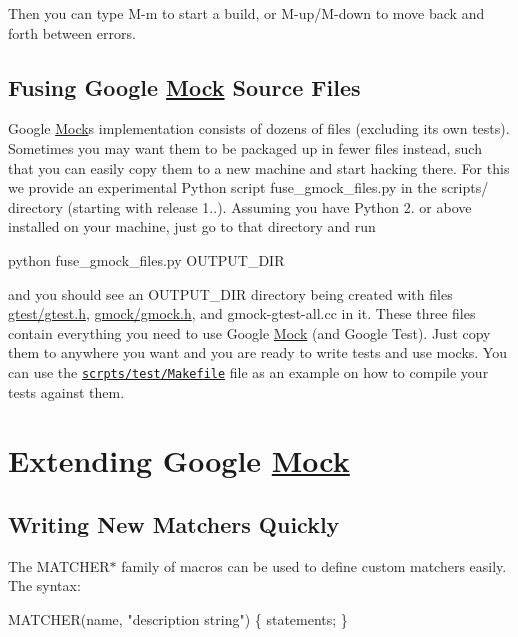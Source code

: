 Then you can type {\ttfamily M-\/m} to start a build, or {\ttfamily M-\/up}/{\ttfamily M-\/down} to move back and forth between errors.

\subsection*{Fusing Google \hyperlink{class_mock}{Mock} Source Files}

Google \hyperlink{class_mock}{Mock}\textquotesingle{}s implementation consists of dozens of files (excluding its own tests). Sometimes you may want them to be packaged up in fewer files instead, such that you can easily copy them to a new machine and start hacking there. For this we provide an experimental Python script {\ttfamily fuse\+\_\+gmock\+\_\+files.\+py} in the {\ttfamily scripts/} directory (starting with release 1..). Assuming you have Python 2. or above installed on your machine, just go to that directory and run 
\begin{DoxyCode}
python fuse\_gmock\_files.py OUTPUT\_DIR
\end{DoxyCode}


and you should see an {\ttfamily O\+U\+T\+P\+U\+T\+\_\+\+D\+IR} directory being created with files {\ttfamily \hyperlink{gtest_8h_source}{gtest/gtest.\+h}}, {\ttfamily \hyperlink{gmock_8h_source}{gmock/gmock.\+h}}, and {\ttfamily gmock-\/gtest-\/all.\+cc} in it. These three files contain everything you need to use Google \hyperlink{class_mock}{Mock} (and Google Test). Just copy them to anywhere you want and you are ready to write tests and use mocks. You can use the \href{http://code.google.com/p/googlemock/source/browse/trunk/scripts/test/Makefile}{\tt scrpts/test/\+Makefile} file as an example on how to compile your tests against them.

\section*{Extending Google \hyperlink{class_mock}{Mock}}

\subsection*{Writing New Matchers Quickly}

The {\ttfamily M\+A\+T\+C\+H\+E\+R$\ast$} family of macros can be used to define custom matchers easily. The syntax\+:


\begin{DoxyCode}
MATCHER(name, "description string") \{ statements; \}
\end{DoxyCode}



